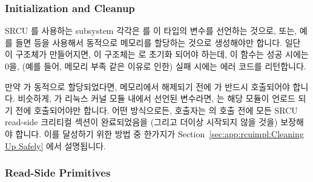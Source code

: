 \subsubsection{Initialization and Cleanup}
\label{sec:app:rcuimpl:Initialization and Cleanup}

SRCU 를 사용하는 subsystem 각각은   를 이 타입의
변수를 선언하는 것으로, 또는, 예를 들면  등을 사용해서 동적으로
메모리를 할당하는 것으로 생성해야만 합니다.
일단 이 구조체가 만들어지면, 이 구조체는  로 초기화
되어야 하는데, 이 함수는 성공 시에는 0을, (예를 들어, 메모리 부족 같은 이유로
인한) 실패 시에는 에러 코드를 리턴합니다.

만약   가 동적으로 할당되었다면, 메모리에서 해제되기
전에  가 반드시 호출되어야 합니다.
비슷하게,   가 리눅스 커널 모듈 내에서 선언된
변수라면,  는 해당 모듈이 언로드 되기 전에
호출되어야만 합니다.
어떤 방식으로든, 호출자는  의 호출 전에 모든 SRCU
read-side 크리티컬 섹션이 완료되었음을 (그리고 더이상 시작되지 않을 것을)
보장해야 합니다.
이를 달성하기 위한 방법 중 한가지가
Section~\ref{sec:app:rcuimpl:Cleaning Up Safely} 에서 설명됩니다.

\subsubsection{Read-Side Primitives}
\label{sec:app:rcuimpl:Read-Side Primitives}

